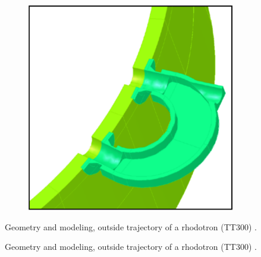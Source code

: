 \documentclass{article}
\begin{document}
\begin{figure}[H]
\begin{subfigure}{.5\textwidth}
      \includegraphics[width=.9\linewidth]{../../../figures/design/tt300_mag.png}
    \end{subfigure}
    \caption{Geometry and modeling, outside trajectory of a rhodotron (TT300) \cite{cite:rhodo_design}.}
    \label{fig:magnet_design_illustrations}
\end{figure} \fi
\vspace{20pt}
\begin{figure}[H]
    \centering
    \qquad{}%
    \vspace{20pt}
    \caption{\centering Geometry and modeling, outside trajectory of a rhodotron (TT300) \cite{cite:rhodo_design}.} 
    \label{fig:magnet_design_illustrations}
\end{figure}
\end{document}
